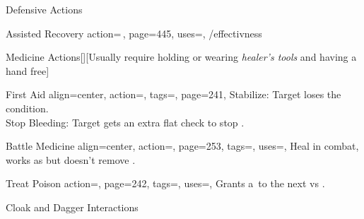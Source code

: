 \begin{PageBack}
\begin{Tables}{\backTableHeight}
\begin{Table}{Defensive Actions}
\begin{entry}{Assisted Recovery}{%
                action={\,\sffamily{}},
                page=445,
                uses=,
            }
{                /effectivness} \hfill{}
            \end{entry}
        \end{Table}
        \TableSpace
        \begin{Table}{Medicine Actions}[][\quad Usually require holding or wearing \textit{healer's tools} and having
        a hand
        free]
            \begin{entry}{First Aid}{%
                align=center,
                action=,
                tags=\Manipulate,
                page=241,
            }%
                \setlength{\tabcolsep}{9pt}%
                \Medicine[][before=Recovery,val=+5]\edash Stabilize:
                Target loses the \Dying condition. 
                \hfill{}\\
                \Medicine[][before=Effect] \hspace{0.2ex}\edash\hspace{0.2ex}Stop Bleeding:
                Target gets an extra \DC[10] flat check to stop \Bleeding.
                \hfill{}
            \end{entry}
            \begin{entry}{Battle Medicine}{%
                align=center,
                action=,
                page=253,
                tags=\Manipulate,
                uses=\Medicine\Feat,
            }
                Heal in combat, works as  but doesn't remove \Wounded.\hfill {}\\
                \hfill\T\DC[15] \quad\quad
                \E\DC[20] \quad\quad
                \M\DC[30]  \quad\quad
                \Le\DC[40] \hfill {}
            \end{entry}
            \begin{entry}{Treat Poison}{%
                action=,
                page=242,
                tags=\Manipulate,
                uses={\Medicine[tags={T}]},
            }
                Grants a \,\Cirm to the next  vs .\hfill{}
            \end{entry}
        \end{Table}
        \TableSpace
        \begin{Table}{Cloak and Dagger Interactions}

\end{Table}
\end{Tables}
\end{PageBack}
